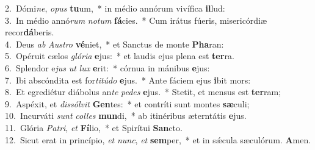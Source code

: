 {2.~}Dómi\textit{ne}, \textit{o}\textit{pus} \textbf{tu}um,~* in médio annórum vivífica \textbf{il}lud:\\
{3.~}In médio annó\textit{rum} \textit{no}\textit{tum} \textbf{fá}cies.~* Cum irátus fúeris, misericórdiæ recor\textbf{dá}beris.\\
{4.~}Deus \textit{ab} \textit{Au}\textit{stro} \textbf{vé}niet,~* et Sanctus de monte \textbf{Pha}ran:\\
{5.~}Opéruit cælos \textit{gló}\textit{ri}\textit{a} \textbf{e}jus:~* et laudis ejus plena est \textbf{ter}ra.\\
{6.~}Splendor e\textit{jus} \textit{ut} \textit{lux} \textbf{e}rit:~* córnua in mánibus \textbf{e}jus:\\
{7.~}Ibi abscóndita est for\textit{ti}\textit{tú}\textit{do} \textbf{e}jus.~* Ante fáciem ejus \textbf{i}bit mors:\\
{8.~}Et egrediétur diábolus an\textit{te} \textit{pe}\textit{des} \textbf{e}jus.~* Stetit, et mensus est \textbf{ter}ram;\\
{9.~}Aspéxit, et \textit{dis}\textit{sól}\textit{vit} \textbf{Gen}tes:~* et contríti sunt montes \textbf{sæ}culi;\\
{10.~}Incurváti \textit{sunt} \textit{col}\textit{les} \textbf{mun}di,~* ab itinéribus æterntátis \textbf{e}jus.\\
{11.~}Glória \textit{Pa}\textit{tri}, \textit{et} \textbf{Fí}lio,~* et Spirítui \textbf{San}cto.\\
{12.~}Sicut erat in princípio, \textit{et} \textit{nunc}, \textit{et} \textbf{sem}per,~* et in sǽcula sæculórum. \textbf{A}men.\\
